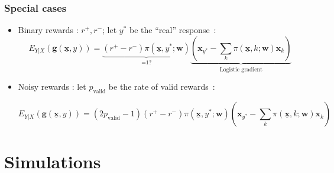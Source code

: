 \documentclass{beamer}
\begin{document}
\begin{frame}\frametitle{Special cases}
	\begin{itemize}
		\item Binary rewards : $r^+,r^-$;
		let $y^*$ be the ``real'' response~:
		$$E_{Y|X}(\boldsymbol{g}(\underline{\mathbf{x}},y)) = \underbrace {(r^+ - r^-) \pi(\underline{\mathbf{x}},y^*;\mathbf{w})}_\text{=1?}
		\underbrace{\left(\boldsymbol{x}_{y^*} - \sum_k  \pi(\underline{\mathbf{x}},k;\boldsymbol{w}) \boldsymbol{x}_k \right)}_\text{Logistic gradient}$$
		\item Noisy rewards : let $p_\text{valid}$ be the rate of valid rewards~:
		\begin{footnotesize}
			$$E_{Y|X}(\boldsymbol{g}(\underline{\mathbf{x}},y)) = (2 p_\text{valid} - 1) (r^+ - r^-) \pi(\underline{\mathbf{x}},y^*;\mathbf{w})
			\left(\boldsymbol{x}_{y^*} - \sum_k  \pi(\underline{\mathbf{x}},k;\boldsymbol{w}) \boldsymbol{x}_k \right)$$
		\end{footnotesize}
	\end{itemize}
\end{frame}

\section{Simulations}
\subsection*{}
\end{document}

